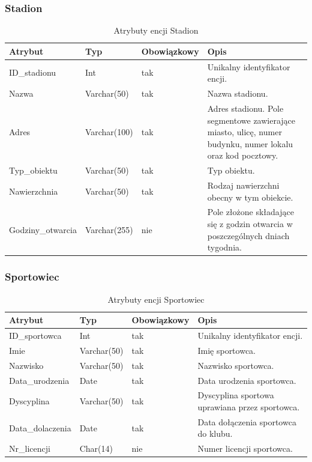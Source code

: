 \documentclass[11pt,a4paper]{article}
\begin{document}
\subsubsection{Stadion}
\begin{table}[H]
\centering
\small
\begin{tabularx}{\textwidth}{|L{3cm}|L{2.25cm}|C{2.67cm}|X|}
\hline
\textbf{Atrybut} & \textbf{Typ} & \textbf{Obowiązkowy} & \textbf{Opis} \\
\hline
ID\_stadionu & Int & tak & Unikalny identyfikator encji. \\
\hline
Nazwa & Varchar(50) & tak & Nazwa stadionu. \\
\hline
Adres & Varchar(100) & tak & Adres stadionu. Pole segmentowe zawierające miasto, ulicę,
numer budynku, numer lokalu oraz kod pocztowy. \\
\hline
Typ\_obiektu & Varchar(50) & tak & Typ obiektu. \\
\hline
Nawierzchnia & Varchar(50) & tak & Rodzaj nawierzchni obecny w tym obiekcie. \\
\hline
Godziny\_otwarcia & Varchar(255) & nie & Pole złożone składające się z godzin otwarcia w
poszczególnych dniach tygodnia. \\
\hline
\end{tabularx}
\caption{Atrybuty encji Stadion}
\label{tab:atrybuty-encja-stadion}
\end{table}

\subsubsection{Sportowiec}
\begin{table}[H]
\centering
\small
\begin{tabularx}{\textwidth}{|L{3cm}|L{2.25cm}|C{2.67cm}|X|}
\hline
\textbf{Atrybut} & \textbf{Typ} & \textbf{Obowiązkowy} & \textbf{Opis} \\
\hline
ID\_sportowca & Int & tak & Unikalny identyfikator encji. \\
\hline
Imie & Varchar(50) & tak & Imię sportowca. \\
\hline
Nazwisko & Varchar(50) & tak & Nazwisko sportowca. \\
\hline
Data\_urodzenia & Date & tak & Data urodzenia sportowca. \\
\hline
Dyscyplina & Varchar(50) & tak & Dyscyplina sportowa uprawiana przez sportowca. \\
\hline
Data\_dolaczenia & Date & tak & Data dołączenia sportowca do klubu. \\
\hline
Nr\_licencji & Char(14) & nie & Numer licencji sportowca. \\
\hline
\end{tabularx}
\caption{Atrybuty encji Sportowiec}
\label{tab:atrybuty-encja-sportowiec}
\end{table}
\end{document}
